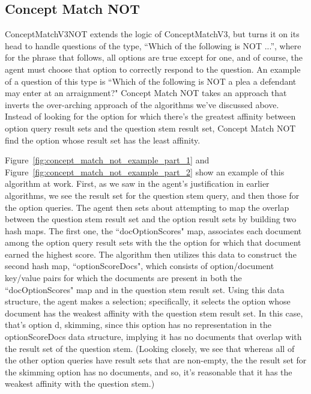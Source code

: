 \subsection{Concept Match NOT}

ConceptMatchV3NOT extends the logic of ConceptMatchV3, but turns it on its head to handle questions of the type, ``Which of the following is NOT ...'', where for the phrase that follows, all options are true except for one, and of course, the agent must choose that option to correctly respond to the question.  An example of a question of this type is ``Which of the following is NOT a plea a defendant may enter at an arraignment?"
Concept Match NOT takes an approach that inverts the over-arching approach of the algorithms we've discussed above.  Instead of looking for the option for which there's the greatest affinity between option query result sets and the question stem result set, Concept Match NOT find the option whose result set has the least affinity.  

Figure~\ref{fig:concept_match_not_example_part_1} and Figure~\ref{fig:concept_match_not_example_part_2} show an example of this algorithm at work.  First, as we saw in the agent's justification in earlier algorithms, we see the result set for the question stem query, and then those for the option queries.  The agent then sets about attempting to map the overlap between the question stem result set and the option result sets by building two hash maps.  The first one, the ``docOptionScores" map, associates each document among the option query result sets with the the option for which that document earned the highest score.  The algorithm then utilizes this data to construct the second hash map, ``optionScoreDocs", which consists of option/document key/value pairs for which the documents are present in both the ``docOptionScores" map and in the question stem result set.  Using this data structure, the agent makes a selection; specifically, it selects the option whose document has the weakest affinity with the question stem result set.  In this case, that's option d, skimming, since this option has no representation in the optionScoreDocs data structure, implying it has no documents that overlap with the result set of the question stem.  (Looking closely, we see that whereas all of the other option queries have result sets that are non-empty, the the result set for the skimming option has no documents, and so, it's reasonable that it has the weakest affinity with the question stem.) 



